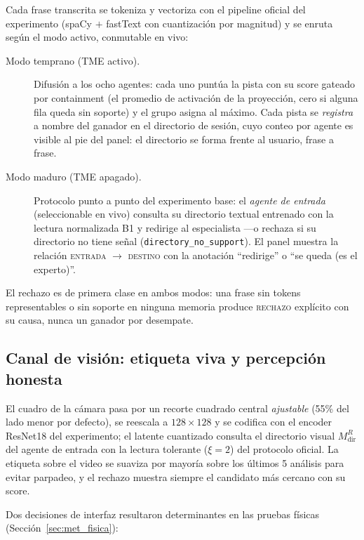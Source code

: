 Cada frase transcrita se tokeniza y vectoriza con el pipeline oficial del experimento
(spaCy \cite{honnibal2020spacy} $+$ fastText con cuantización por magnitud) y se
enruta según el modo activo, conmutable en vivo:

\begin{description}
    \item[Modo temprano (TME activo).] Difusión a los ocho agentes: cada uno puntúa la
    pista con su score gateado por containment (el promedio de activación de la
    proyección, cero si alguna fila queda sin soporte) y el grupo asigna al máximo.
    Cada pista se \emph{registra} a nombre del ganador en el directorio de sesión, cuyo
    conteo por agente es visible al pie del panel: el directorio se forma frente al
    usuario, frase a frase.

    \item[Modo maduro (TME apagado).] Protocolo punto a punto del experimento base: el
    \emph{agente de entrada} (seleccionable en vivo) consulta su directorio textual
    entrenado con la lectura normalizada B1 y redirige al especialista ---o rechaza si
    su directorio no tiene señal (\texttt{directory\_no\_support}).
    El panel muestra la relación \textsc{entrada} $\to$ \textsc{destino} con la
    anotación ``redirige'' o ``se queda (es el experto)''.
\end{description}

El rechazo es de primera clase en ambos modos: una frase sin tokens representables o
sin soporte en ninguna memoria produce \textsc{rechazo} explícito con su causa, nunca
un ganador por desempate.

\subsection{Canal de visión: etiqueta viva y percepción honesta}

El cuadro de la cámara pasa por un recorte cuadrado central \emph{ajustable}
(55\% del lado menor por defecto), se reescala a $128\times128$ y se codifica con el
encoder ResNet18 del experimento; el latente cuantizado consulta el directorio visual
$M^{R}_{\mathrm{dir}}$ del agente de entrada con la lectura tolerante ($\xi = 2$) del
protocolo oficial.
La etiqueta sobre el video se suaviza por mayoría sobre los últimos 5 análisis para
evitar parpadeo, y el rechazo muestra siempre el candidato más cercano con su score.

Dos decisiones de interfaz resultaron determinantes en las pruebas físicas
(Sección~\ref{sec:met_fisica}):

